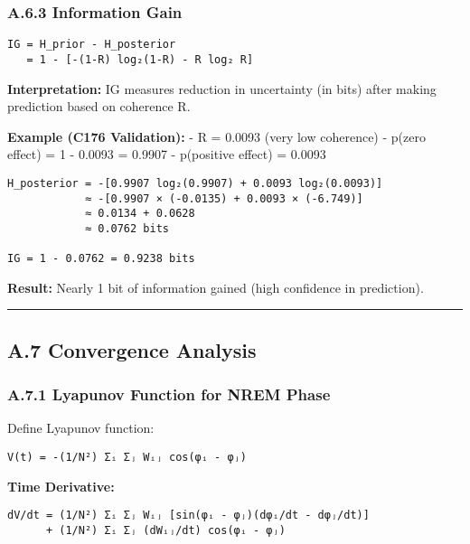 \documentclass[
]{article}
\begin{document}
\subsubsection{A.6.3 Information Gain}\label{a.6.3-information-gain}

\begin{verbatim}
IG = H_prior - H_posterior
   = 1 - [-(1-R) log₂(1-R) - R log₂ R]
\end{verbatim}

\textbf{Interpretation:} IG measures reduction in uncertainty (in bits)
after making prediction based on coherence R.

\textbf{Example (C176 Validation):} - R = 0.0093 (very low coherence) -
p(zero effect) = 1 - 0.0093 = 0.9907 - p(positive effect) = 0.0093

\begin{verbatim}
H_posterior = -[0.9907 log₂(0.9907) + 0.0093 log₂(0.0093)]
            ≈ -[0.9907 × (-0.0135) + 0.0093 × (-6.749)]
            ≈ 0.0134 + 0.0628
            ≈ 0.0762 bits

IG = 1 - 0.0762 = 0.9238 bits
\end{verbatim}

\textbf{Result:} Nearly 1 bit of information gained (high confidence in
prediction).

\begin{center}\rule{0.5\linewidth}{0.5pt}\end{center}

\subsection{A.7 Convergence Analysis}\label{a.7-convergence-analysis}

\subsubsection{A.7.1 Lyapunov Function for NREM
Phase}\label{a.7.1-lyapunov-function-for-nrem-phase}

Define Lyapunov function:

\begin{verbatim}
V(t) = -(1/N²) Σᵢ Σⱼ Wᵢⱼ cos(φᵢ - φⱼ)
\end{verbatim}

\textbf{Time Derivative:}

\begin{verbatim}
dV/dt = (1/N²) Σᵢ Σⱼ Wᵢⱼ [sin(φᵢ - φⱼ)(dφᵢ/dt - dφⱼ/dt)]
      + (1/N²) Σᵢ Σⱼ (dWᵢⱼ/dt) cos(φᵢ - φⱼ)
\end{verbatim}
\end{document}
